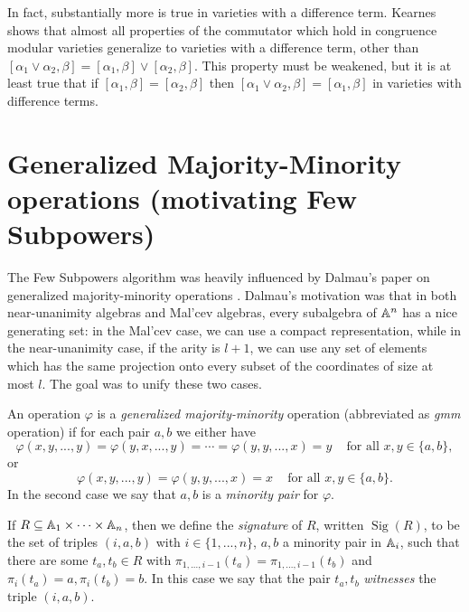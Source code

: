\documentclass[letterpaper,11pt]{article}
\begin{document}
In fact, substantially more is true in varieties with a difference term. Kearnes \cite{kearnes-difference} shows that almost all properties of the commutator which hold in congruence modular varieties generalize to varieties with a difference term, other than $[\alpha_1 \vee \alpha_2,\beta] = [\alpha_1,\beta] \vee [\alpha_2,\beta]$. This property must be weakened, but it is at least true that if $[\alpha_1,\beta] = [\alpha_2,\beta]$ then $[\alpha_1\vee\alpha_2,\beta] = [\alpha_1,\beta]$ in varieties with difference terms.


\section{Generalized Majority-Minority operations (motivating Few Subpowers)}

The Few Subpowers algorithm was heavily influenced by Dalmau's paper on generalized majority-minority operations \cite{dalmau-gmm}. Dalmau's motivation was that in both near-unanimity algebras and Mal'cev algebras, every subalgebra of $\mathbb{A}^n$ has a nice generating set: in the Mal'cev case, we can use a compact representation, while in the near-unanimity case, if the arity is $l+1$, we can use any set of elements which has the same projection onto every subset of the coordinates of size at most $l$. The goal was to unify these two cases.

\begin{defn} An operation $\varphi$ is a \emph{generalized majority-minority} operation (abbreviated as \emph{gmm} operation) if for each pair $a,b$ we either have
\[
\varphi(x,y,...,y) = \varphi(y,x,...,y) = \cdots = \varphi(y,y,...,x) = y \;\;\; \text{ for all }x,y \in \{a,b\},
\]
or
\[
\varphi(x,y,...,y) = \varphi(y,y,...,x) = x \;\;\; \text{ for all }x,y \in \{a,b\}.
\]
In the second case we say that $a,b$ is a \emph{minority pair} for $\varphi$.
\end{defn}

\begin{defn} If $R \subseteq \mathbb{A}_1 \times \cdots \times \mathbb{A}_n$, then we define the \emph{signature} of $R$, written $\operatorname{Sig}(R)$, to be the set of triples $(i,a,b)$ with $i \in \{1, ..., n\}$, $a,b$ a minority pair in $\mathbb{A}_i$, such that there are some $t_a,t_b \in R$ with $\pi_{1, ..., i-1}(t_a) = \pi_{1, ..., i-1}(t_b)$ and $\pi_i(t_a) = a, \pi_i(t_b) = b$. In this case we say that the pair $t_a,t_b$ \emph{witnesses} the triple $(i,a,b)$.
\end{defn}
\end{document}
